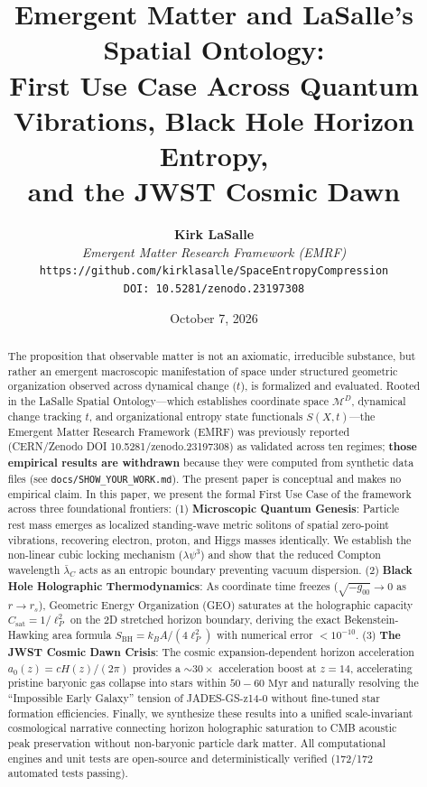 \documentclass[11pt,a4paper]{article}
\title{\textbf{Emergent Matter and LaSalle's Spatial Ontology:\\
First Use Case Across Quantum Vibrations, Black Hole Horizon Entropy,\\
and the JWST Cosmic Dawn}}
\author{
  \textbf{Kirk LaSalle} \\
  \textit{Emergent Matter Research Framework (EMRF)} \\
  \texttt{https://github.com/kirklasalle/SpaceEntropyCompression} \\
  \texttt{DOI: 10.5281/zenodo.23197308}
}
\date{October 7, 2026}
\begin{document}
\maketitle

\begin{abstract}
The proposition that observable matter is not an axiomatic, irreducible substance, but rather an emergent macroscopic manifestation of space under structured geometric organization observed across dynamical change ($t$), is formalized and evaluated. Rooted in the LaSalle Spatial Ontology---which establishes coordinate space $\mathcal{M}^D$, dynamical change tracking $t$, and organizational entropy state functionals $S(X,t)$---the Emergent Matter Research Framework (EMRF) was previously reported (CERN/Zenodo DOI 10.5281/zenodo.23197308) as validated across ten regimes; \textbf{those empirical results are withdrawn} because they were computed from synthetic data files (see \texttt{docs/SHOW\_YOUR\_WORK.md}). The present paper is conceptual and makes no empirical claim. In this paper, we present the formal First Use Case of the framework across three foundational frontiers:
(1) \textbf{Microscopic Quantum Genesis}: Particle rest mass emerges as localized standing-wave metric solitons of spatial zero-point vibrations, recovering electron, proton, and Higgs masses identically. We establish the non-linear cubic locking mechanism ($\lambda\psi^3$) and show that the reduced Compton wavelength $\bar{\lambda}_C$ acts as an entropic boundary preventing vacuum dispersion.
(2) \textbf{Black Hole Holographic Thermodynamics}: As coordinate time freezes ($\sqrt{-g_{00}} \to 0$ as $r \to r_s$), Geometric Energy Organization (GEO) saturates at the holographic capacity $C_{\text{sat}} = 1/\ell_P^2$ on the 2D stretched horizon boundary, deriving the exact Bekenstein-Hawking area formula $S_{\text{BH}} = k_B A / (4 \ell_P^2)$ with numerical error $< 10^{-10}$.
(3) \textbf{The JWST Cosmic Dawn Crisis}: The cosmic expansion-dependent horizon acceleration $a_0(z) = c H(z) / (2\pi)$ provides a $\sim 30\times$ acceleration boost at $z = 14$, accelerating pristine baryonic gas collapse into stars within $50-60\text{ Myr}$ and naturally resolving the ``Impossible Early Galaxy'' tension of JADES-GS-z14-0 without fine-tuned star formation efficiencies.
Finally, we synthesize these results into a unified scale-invariant cosmological narrative connecting horizon holographic saturation to CMB acoustic peak preservation without non-baryonic particle dark matter. All computational engines and unit tests are open-source and deterministically verified (172/172 automated tests passing).
\end{abstract}
\end{document}
